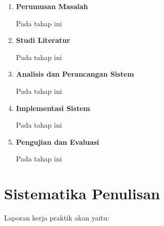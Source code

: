 \begin{enumerate}[nolistsep]

  \item \textbf{Perumusan Masalah}
  \vspace{0.5ex}

  Pada tahap ini \lipsum[1][1-3]
  \vspace{0.5ex}

  \item \textbf{Studi Literatur}
  \vspace{0.5ex}

  Pada tahap ini \lipsum[1][1-3]
  \vspace{0.5ex}

  \item \textbf{Analisis dan Perancangan Sistem}
  \vspace{0.5ex}

  Pada tahap ini \lipsum[1][1-3]
  \vspace{0.5ex}

  \item \textbf{Implementasi Sistem}
  \vspace{0.5ex}

  Pada tahap ini \lipsum[1][1-3]
  \vspace{0.5ex}

  \item \textbf{Pengujian dan Evaluasi}
  \vspace{0.5ex}

  Pada tahap ini \lipsum[1][1-3]
  \vspace{0.5ex}

\end{enumerate}
\vspace{0.5ex}

\section{Sistematika Penulisan}
\vspace{1ex}

Laporan kerja praktik akan \lipsum[1][1] yaitu:
\vspace{0.5ex}

